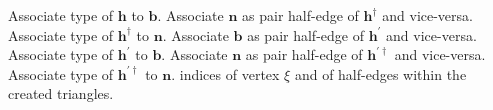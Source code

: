 \documentclass[aps, superscriptaddress, notitlepage, longbibliography]{revtex4-1}
\begin{document}
\begin{algorithm}[H]
\begin{algorithmic}[1]
\STATEx Associate type of $\boldsymbol{h}$ to $\boldsymbol{b}$.
\STATE Associate $\boldsymbol{n}$ as pair half-edge of $\boldsymbol{h}^{\dagger}$ and vice-versa.
\STATEx Associate type of $\boldsymbol{h}^{\dagger}$ to $\boldsymbol{n}$.
 
 
\STATE Associate $\boldsymbol{b}$ as pair half-edge of $\boldsymbol{h}^{\prime}$ and vice-versa.
\STATEx Associate type of $\boldsymbol{h}^{\prime}$ to $\boldsymbol{b}$.
\STATE Associate $\boldsymbol{n}$ as pair half-edge of $\boldsymbol{h}^{\prime\dagger}$ and vice-versa.
\STATEx Associate type of $\boldsymbol{h}^{\prime\dagger}$ to $\boldsymbol{n}$.
\RETURN indices of vertex $\xi$ and of half-edges within the created triangles.
\end{algorithmic}
\end{algorithm}
\end{document}
